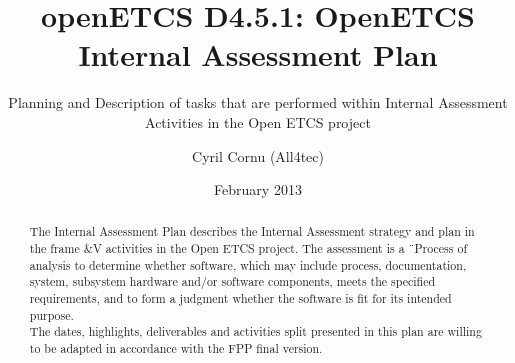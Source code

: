 \documentclass{template/openetcs_article}
\begin{document}
\frontmatter
{}




\title{openETCS D4.5.1: OpenETCS Internal Assessment Plan}

\subtitle{Planning and Description of tasks that are performed within Internal Assessment Activities in the Open ETCS project}

\date{February 2013}

\author{Cyril Cornu (All4tec)}






\begin{abstract}
The Internal Assessment Plan describes the Internal Assessment strategy and plan in the frame \&V activities in the Open ETCS project.
The assessment is a \"\ Process of analysis to determine whether software, which may include process, documentation, system, subsystem hardware and/or software components, meets the specified requirements, and to form a judgment whether the software is fit for its intended purpose.\"
\\
The dates, highlights, deliverables and activities split presented in this plan are willing to be adapted in accordance with the FPP final version.
\end{abstract}

\maketitle
\setcounter{tocdepth}{2}
\tableofcontents
\newpage

\end{document}
